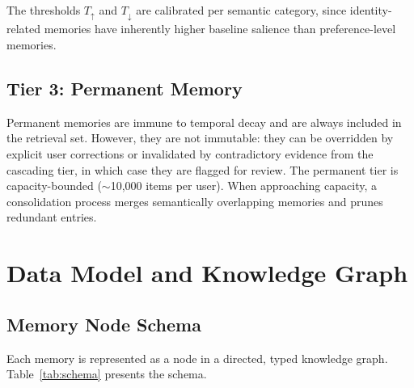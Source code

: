 \documentclass[11pt,a4paper]{article}
\begin{document}
\noindent The thresholds $T_{\uparrow}$ and $T_{\downarrow}$ are calibrated per semantic category, since identity-related memories have inherently higher baseline salience than preference-level memories.

\subsection{Tier 3: Permanent Memory}

Permanent memories are immune to temporal decay and are always included in the retrieval set. However, they are not immutable: they can be overridden by explicit user corrections or invalidated by contradictory evidence from the cascading tier, in which case they are flagged for review. The permanent tier is capacity-bounded ($\sim$10,000 items per user). When approaching capacity, a consolidation process merges semantically overlapping memories and prunes redundant entries.


\section{Data Model and Knowledge Graph}
\label{sec:data_model}

\subsection{Memory Node Schema}

Each memory is represented as a node in a directed, typed knowledge graph. Table~\ref{tab:schema} presents the schema.
\end{document}
